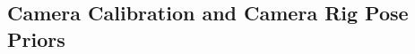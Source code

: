 \documentclass[letterpaper, 10 pt, conference]{ieeeconf}  %
\begin{document}














\subsection{Camera Calibration and Camera Rig Pose Priors} 
\label{subsec:methodology_camera_calibration}


\end{document}

